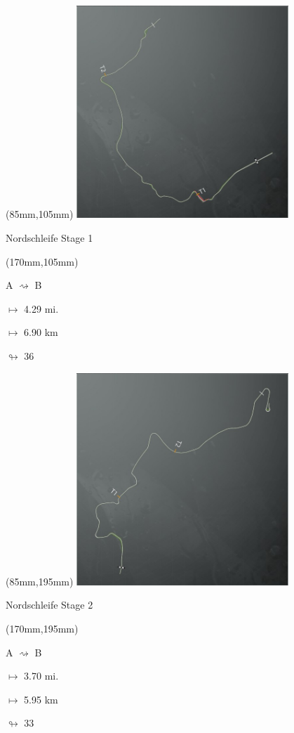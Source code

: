 \begin{textblock*}{80mm}(85mm,105mm)%
\includegraphics[width=80mm]{TR/2015-05-20_00038.png}
\centerline{Nordschleife Stage 1}
\end{textblock*}
\begin{textblock*}{30mm}(170mm,105mm)%
\par A $\rightsquigarrow$ B
\Large
\par$\mapsto$ 4.29 mi.
\par$\mapsto$ 6.90 km
\par$\looparrowright$ 36
\end{textblock*}
\begin{textblock*}{80mm}(85mm,195mm)%
\includegraphics[width=80mm]{TR/2015-05-20_00039.png}
\centerline{Nordschleife Stage 2}
\end{textblock*}
\begin{textblock*}{30mm}(170mm,195mm)%
\par A $\rightsquigarrow$ B
\Large
\par$\mapsto$ 3.70 mi.
\par$\mapsto$ 5.95 km
\par$\looparrowright$ 33
\end{textblock*}
\null\newpage

